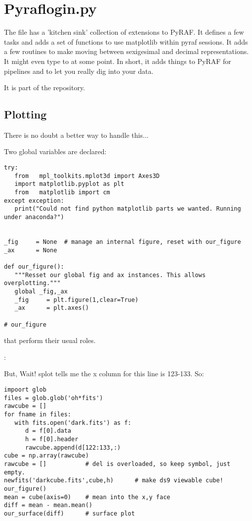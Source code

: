 \section{Pyraflogin.py}

The file  has a 'kitchen sink' collection of
extensions to PyRAF. It defines a few tasks and adds a set of functions
to use matplotlib within pyraf sessions. It adds a few routines to make
moving between sexigesimal and decimal representations. It might even
type to  at some point. In short, it adds things to PyRAF
for pipelines and to let you really dig into your data.

It is part of the  repository.

\subsection{Plotting}

There is no doubt a better way to handle this...

Two global variables are declared:

\begingroup \fontsize{10pt}{10pt}
\selectfont
\begin{verbatim} 
try:
   from   mpl_toolkits.mplot3d import Axes3D
   import matplotlib.pyplot as plt
   from   matplotlib import cm
except exception:
   print("Could not find python matplotlib parts we wanted. Running under anaconda?")


_fig     = None  # manage an internal figure, reset with our_figure
_ax      = None

def our_figure():
   """Resset our global fig and ax instances. This allows overplotting."""
   global _fig,_ax
   _fig     = plt.figure(1,clear=True)
   _ax      = plt.axes()

# our_figure

\end{verbatim}
\endgroup

that perform their usual roles.

:

But, Wait! splot tells me the x column for this line is 123-133.
So:

\begingroup \fontsize{10pt}{10pt}
\selectfont
\begin{verbatim} 
impoort glob
files = glob.glob('oh*fits')
rawcube = []
for fname in files:
   with fits.open('dark.fits') as f:
      d = f[0].data
      h = f[0].header 
      rawcube.append(d[122:133,:)
cube = np.array(rawcube)
rawcube = []           # del is overloaded, so keep symbol, just empty.
newfits('darkcube.fits',cube,h)      # make ds9 viewable cube!
our_figure()
mean = cube(axis=0)    # mean into the x,y face
diff = mean - mean.mean()
our_surface(diff)      # surface plot
\end{verbatim}
\endgroup

